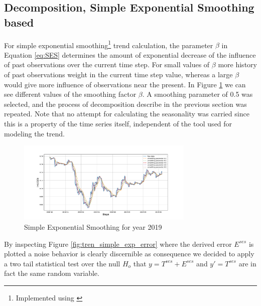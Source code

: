 \subsection{Decomposition, Simple Exponential Smoothing based}


For simple exponential smoothing\footnote{Implemented using \cite{Statsmodels}} trend calculation, the parameter $\beta$ in Equation \ref{eq:SES} determines the amount of exponential decrease of the influence of past observations over the current time step. For small values of $\beta$ more history of past observations weight in the current time step value, whereas a large $\beta$ would give more influence of observations near the present. In Figure \ref{fig:tren_simple_exp} we can see different values of the smoothing factor $\beta$. A smoothing parameter of 0.5 was selected, and the process of decomposition describe in the previous section was repeated. Note that no attempt for calculating the seasonality was carried since this is a property of the time series itself, independent of the tool used for modeling the trend.

\begin{figure}[h!] %
	\centering %
	\includegraphics[width=0.75\textwidth]{notebooks/data/trend_SES.pdf} %
	\caption{Simple Exponential Smoothing for year 2019} %
	\label{fig:tren_simple_exp} %
\end{figure}

By inspecting Figure \ref{fig:tren_simple_exp_error} where the derived error $E^{ses}$ is plotted a noise behavior is clearly discernible as consequence we  decided to apply  a two tail statistical test over the null $H_{o}$ that $y=T^{ses}+E^{ses}$ and $y'=T^{ses}$ are in fact the same random variable.

